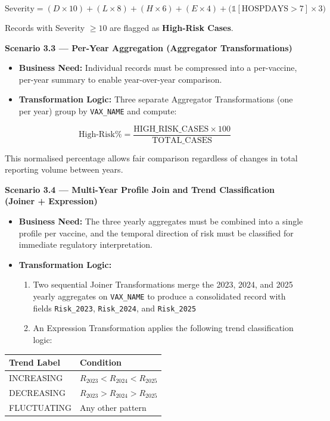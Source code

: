 \documentclass[12pt,a4paper]{report}
\begin{document}
\[
\text{Severity} = (D \times 10) + (L \times 8) + (H \times 6) + (E \times 4) + \bigl(\mathbb{1}[\text{HOSPDAYS}>7] \times 3\bigr)
\]

Records with Severity $\geq 10$ are flagged as \textbf{High-Risk Cases}.

\bigskip

\noindent\textbf{Scenario 3.3 — Per-Year Aggregation (Aggregator Transformations)}

\begin{itemize}[leftmargin=*]
  \item \textbf{Business Need:} Individual records must be compressed into a per-vaccine, per-year summary to enable year-over-year comparison.
  \item \textbf{Transformation Logic:} Three separate Aggregator Transformations (one per year) group by \texttt{VAX\_NAME} and compute:
\end{itemize}

\[
\text{High-Risk\%} = \frac{\text{HIGH\_RISK\_CASES} \times 100}{\text{TOTAL\_CASES}}
\]

This normalised percentage allows fair comparison regardless of changes in total reporting volume between years.

\bigskip

\noindent\textbf{Scenario 3.4 — Multi-Year Profile Join and Trend Classification (Joiner + Expression)}

\begin{itemize}[leftmargin=*]
  \item \textbf{Business Need:} The three yearly aggregates must be combined into a single profile per vaccine, and the temporal direction of risk must be classified for immediate regulatory interpretation.
  \item \textbf{Transformation Logic:}
    \begin{enumerate}[leftmargin=*]
      \item Two sequential Joiner Transformations merge the 2023, 2024, and 2025 yearly aggregates on \texttt{VAX\_NAME} to produce a consolidated record with fields \texttt{Risk\_2023}, \texttt{Risk\_2024}, and \texttt{Risk\_2025}
      \item An Expression Transformation applies the following trend classification logic:
    \end{enumerate}
\end{itemize}

\begin{center}
\begin{tabular}{ll}
\toprule
\textbf{Trend Label} & \textbf{Condition} \\
\midrule
INCREASING   & $R_{2023} < R_{2024} < R_{2025}$ \\
DECREASING   & $R_{2023} > R_{2024} > R_{2025}$ \\
FLUCTUATING  & Any other pattern \\
\bottomrule
\end{tabular}
\end{center}
\end{document}
